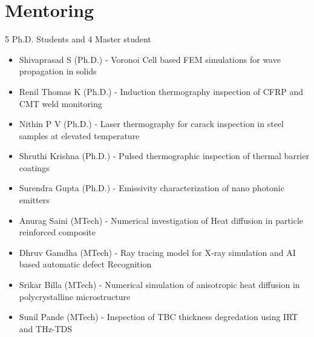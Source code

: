 \documentclass{my_cv}%
\begin{document}
\section{Mentoring}
\vspace{1em}
\noindent \faEye \hspace{1em} \color{mygray} 5 Ph.D. Students and 4 Master student 
\begin{itemize}[leftmargin=0.15in]
\setlength\itemsep{-0.1em}
\color{mygray}
\item Shivaprasad S (Ph.D.) - Voronoi Cell based FEM simulations for wave propagation in solids \cite{Shivaprasadcomsolconf2015,Shivaprasadconf2015}
\item Renil Thomas K (Ph.D.) - Induction thermography inspection of CFRP and CMT weld monitoring \cite{Renilconf2016,Kidanganconf2016,thomas2017} 
\item Nithin P V (Ph.D.) - Laser thermography for carack inspection in steel samples at elevated temperature \cite{Nithin2019,Nithinconf2016,Nithinconf2018,puthiyaveettil2020}
\item Shruthi Krishna (Ph.D.) - Pulsed thermographic inspection of thermal barrier coatings \cite{Sruthiconf2018,Krishnaconf2017}
\item Surendra Gupta (Ph.D.) - Emissivity characterization of nano photonic emitters \cite{Surendra2020}
\item Anurag Saini (MTech) - Numerical investigation of Heat diffusion in particle reinforced composite \cite{Saini2020}
\item Dhruv Gamdha (MTech) - Ray tracing model for X-ray simulation and AI based automatic defect Recognition \cite{Dhruv2019,Dhruv2020}
\item Srikar Billa (MTech) - Numerical simulation of anisotropic heat diffusion in polycrystalline microstructure
\item Sunil Pande (MTech) - Inspection of TBC thickness degredation using IRT and THz-TDS
\end{itemize}
\end{document}

